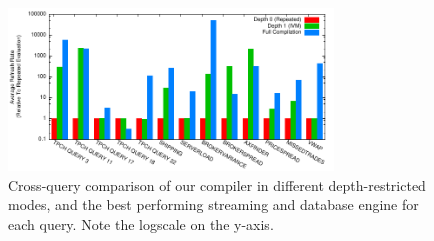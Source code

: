 
\newcommand{\figurewidth}[0]{1.8in}

\newcommand{\tablefig}[1]{
  \hspace*{-0.25in}
  \texttt{[image: ../graphs/graphs/\#1]}
}

\begin{figure}
\begin{center}
\includegraphics[width=3.4in]{../graphs/graphs/bakeoff.pdf}
\caption{Cross-query comparison of our compiler in different depth-restricted modes, and the best performing streaming and database engine for each query.  Note the logscale on the y-axis.}
\label{fig:experiments:bakeoff}
\end{center}
\end{figure}

